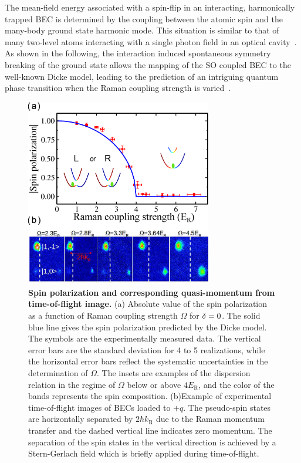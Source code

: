 \documentclass[prl,aps,twocolumn,floatfix]{revtex4}
\begin{document}
The mean-field energy associated with a spin-flip in an interacting,
harmonically trapped BEC is determined by the coupling between the atomic
spin and the many-body ground state harmonic mode. This situation is similar
to that of many two-level atoms interacting with a single photon field in an
optical cavity~\cite{Dicke}. As shown in the following, the interaction
induced spontaneous symmetry breaking of the ground state allows the mapping
of the SO coupled BEC to the well-known Dicke model, leading to the
prediction of an intriguing quantum phase transition when the Raman coupling
strength is varied~\cite{Yongping}.

\begin{figure}[tbp]
\centering
\includegraphics[width=3.2in]{Figure-2Engels.eps}
\caption{\textbf{Spin polarization and corresponding quasi-momentum from
time-of-flight image.} (a) Absolute value of the spin polarization as a
function of Raman coupling strength $\Omega $ for $\protect\delta =0$. The
solid blue line gives the spin polarization predicted by the Dicke model.
The symbols are the experimentally measured data. The vertical error bars
are the standard deviation for 4 to 5 realizations, while the horizontal
error bars reflect the systematic uncertainties in the determination of $%
\Omega$. The insets are examples of the dispersion relation in the regime of
$\Omega $ below or above $4E_{\text{R}}$, and the color of the bands
represents the spin composition. (b)Example of experimental time-of-flight
images of BECs loaded to $+q$. The pseudo-spin states are horizontally
separated by $2\hbar {k_{\text{R}}}$ due to the Raman momentum transfer and
the dashed vertical line indicates zero momentum. The separation of the spin
states in the vertical direction is achieved by a Stern-Gerlach field which
is briefly applied during time-of-flight.}
\label{Fig2}
\end{figure}
\end{document}
